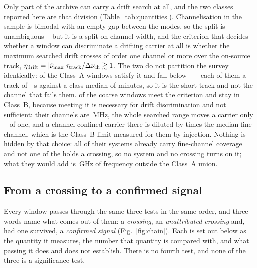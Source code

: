 Only part of the archive can carry a drift search at all, and the two
classes reported here are that division (Table~\ref{tab:quantities}).
Channelisation in the sample is bimodal with an empty gap between the
modes, so the split is unambiguous -- but it is a split on channel width,
and the criterion that decides whether a window can discriminate a drifting
carrier at all is whether the maximum searched drift crosses of order one
channel or more over the on-source track, $\eta_{\rm drift} =
|\dot\nu_{\max}|\tau_{\rm track}/\Delta\nu_{\rm ch} \gtrsim 1$. The two do
not partition the survey identically: \EtaDriftAOk{} of the \NWinA{} Class~A
windows satisfy it and \EtaDriftALo{} fall below -- \ScLoNames{} -- each of
them a track of \ScLoTauLoS--\ScLoTauHiS\,s against a class median of
\ScLoTauMedAllMin{} minutes, so it is the short track and not the channel
that fails them. \EtaDriftBHi{} of the \NWinB{} coarse windows meet the
criterion and stay in Class~B, because meeting it is necessary for drift
discrimination and not sufficient: their channels are \ScBhChanMHz\,MHz, the
whole searched range moves a carrier only \ScBhEtaLo--\ScBhEtaHi{} of one,
and a channel-confined carrier there is diluted by \ScBhDiluteFac{} times
the median fine channel, which is the Class~B limit measured for them by
injection. Nothing is hidden by that choice: all \ScBhNSys{} of their
systems already carry fine-channel coverage and not one of the
\EtaDriftBHi{} holds a crossing, so no system and no crossing turns on it;
what they would add is \ScBhNewBandGHz\,GHz of frequency outside the
Class~A union.

\subsection{From a crossing to a confirmed signal}
\label{sec:summary}

Every window passes through the same three tests in the same order, and
three words name what comes out of them: a \emph{crossing}, an
\emph{unattributed crossing} and, had one survived, a \emph{confirmed
signal} (Fig.~\ref{fig:chain}). Each is set out below as the quantity it
measures, the number that quantity is compared with, and what passing it
does and does not establish. There is no fourth
test, and none of the three is a significance test.

